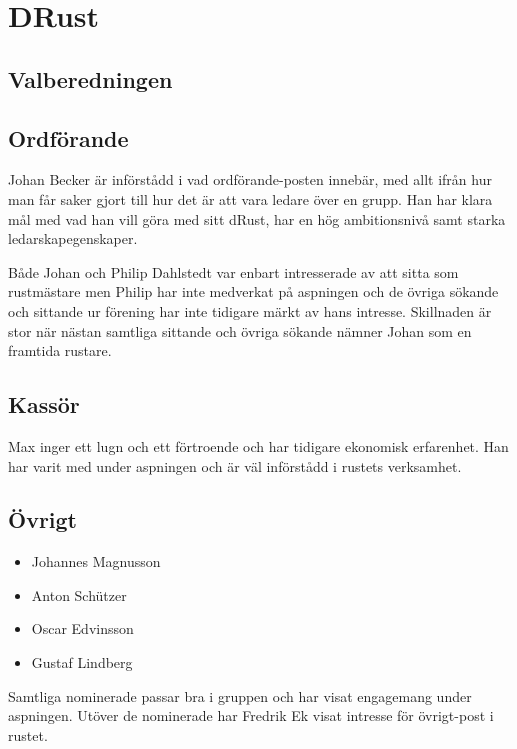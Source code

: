\section{DRust}

\subsection{Valberedningen}
\begin{autoframe}

\end{autoframe}


\subsection{Ordförande}
\begin{autoframe}

Johan Becker är införstådd i vad ordförande-posten innebär, med allt ifrån hur man får saker gjort till hur det är att vara ledare över en grupp.  Han har klara mål med vad han vill göra med sitt dRust, har en hög ambitionsnivå samt starka ledarskapegenskaper. 

\bigskip
Både Johan och Philip Dahlstedt var enbart intresserade av att sitta som rustmästare men Philip har inte medverkat på aspningen och de övriga sökande och sittande ur förening har inte tidigare märkt av hans intresse. Skillnaden är stor när nästan samtliga sittande och övriga sökande nämner Johan som en framtida rustare.  
\end{autoframe}

\subsection{Kassör}
\begin{autoframe}

Max inger ett lugn och ett förtroende och har tidigare ekonomisk erfarenhet. Han har varit med under aspningen och är väl införstådd i rustets verksamhet.
\end{autoframe}

\subsection{Övrigt}
\begin{autoframe}

\begin{itemize}
\item Johannes Magnusson
\item Anton Schützer
\item Oscar Edvinsson
\item Gustaf Lindberg
\end{itemize}

\bigskip
Samtliga nominerade passar bra i gruppen och har visat engagemang under aspningen.  Utöver de nominerade har Fredrik Ek visat intresse för övrigt-post i rustet. 
\end{autoframe}